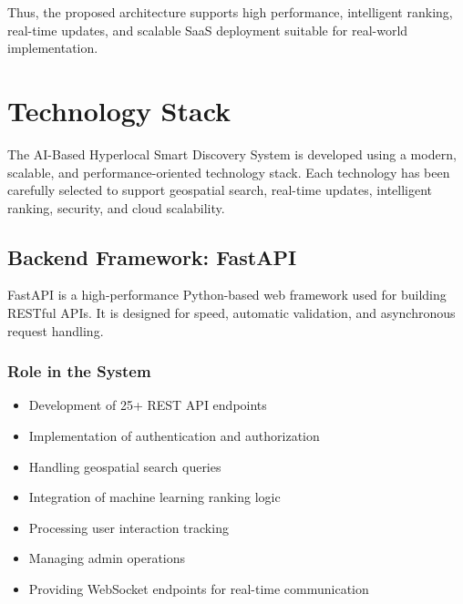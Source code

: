 \documentclass[12pt,a4paper]{report}
\begin{document}
Thus, the proposed architecture supports high performance, intelligent ranking, real-time updates, and scalable SaaS deployment suitable for real-world implementation.


\chapter{Technology Stack}

The AI-Based Hyperlocal Smart Discovery System is developed using a modern, scalable, and performance-oriented technology stack. Each technology has been carefully selected to support geospatial search, real-time updates, intelligent ranking, security, and cloud scalability.

\section{Backend Framework: FastAPI}

FastAPI is a high-performance Python-based web framework used for building RESTful APIs. It is designed for speed, automatic validation, and asynchronous request handling.

\subsection*{Role in the System}

\begin{itemize}

\item Development of 25+ REST API endpoints

\item Implementation of authentication and authorization

\item Handling geospatial search queries

\item Integration of machine learning ranking logic

\item Processing user interaction tracking

\item Managing admin operations

\item Providing WebSocket endpoints for real-time communication

\end{itemize}
\end{document}
